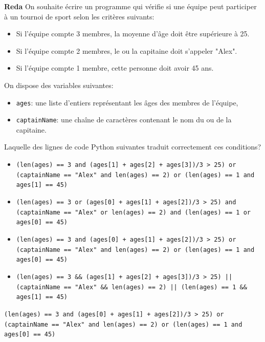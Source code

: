 \begin{Exercice}[5 minutes]\textbf{Reda}
On souhaite écrire un programme qui vérifie si une équipe peut participer à un tournoi de sport selon les critères suivants:

\begin{itemize}
\item Si l’équipe compte 3 membres, la moyenne d’âge doit être supérieure à 25.
\item Si l’équipe compte 2 membres, le ou la capitaine doit s’appeler "Alex".
\item Si l’équipe compte 1 membre, cette personne doit avoir 45 ans.
\end{itemize}

On dispose des variables suivantes:

\begin{itemize}
\item \texttt{ages}: une liste d’entiers représentant les âges des membres de l’équipe,
\item \texttt{captainName}: une chaîne de caractères contenant le nom du ou de la capitaine.
\end{itemize}

Laquelle des lignes de code Python suivantes traduit correctement ces conditions?
\begin{itemize}
  \item \texttt{(len(ages) == 3 and (ages[1] + ages[2] + ages[3])/3 > 25) or (captainName == "Alex" and len(ages) == 2) or (len(ages) == 1 and ages[1] == 45)}

  \item \texttt{(len(ages) == 3 or (ages[0] + ages[1] + ages[2])/3 > 25) and (captainName == "Alex" or len(ages) == 2) and (len(ages) == 1 or ages[0] == 45)}

  \item \texttt{(len(ages) == 3 and (ages[0] + ages[1] + ages[2])/3 > 25) or (captainName == "Alex" and len(ages) == 2) or (len(ages) == 1 and ages[0] == 45)}

  \item \texttt{(len(ages) == 3 \&\& (ages[1] + ages[2] + ages[3])/3 > 25) || (captainName == "Alex" \&\& len(ages) == 2) || (len(ages) == 1 \&\& ages[1] == 45)}
\end{itemize}

\begin{solution}
\texttt{(len(ages) == 3 and (ages[0] + ages[1] + ages[2])/3 > 25) or (captainName == "Alex" and len(ages) == 2) or (len(ages) == 1 and ages[0] == 45)}
\end{solution}


\end{Exercice}

